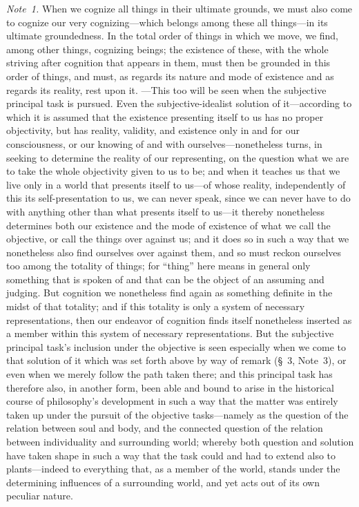 \documentclass[12pt,a4paper]{book}
\begin{document}
{\small\emph{Note~1.} When we cognize all things in their ultimate grounds, we must
also come to cognize our very cognizing---which belongs among these all things---in
its ultimate groundedness. In the total order of things in which we move, we find,
among other things, cognizing beings; the existence of these, with the whole
striving after cognition that appears in them, must then be grounded in this order
of things, and must, as regards its nature and mode of existence and as regards its
reality, rest upon it. ---This too will be seen when the subjective principal task
is pursued. Even the subjective-idealist solution of it---according to which it is
assumed that the existence presenting itself to us has no proper objectivity, but
has reality, validity, and existence only in and for our consciousness, or our
knowing of and with ourselves---nonetheless turns, in seeking to determine the
reality of our representing, on the question what we are to take the whole
objectivity given to us to be; and when it teaches us that we live only in a world
that presents itself to us---of whose reality, independently of this its
self-presentation to us, we can never speak, since we can never have to do with
anything other than what presents itself to us---it thereby nonetheless determines
both our existence and the mode of existence of what we call the objective, or call
the things over against us; and it does so in such a way that we nonetheless also
find ourselves over against them, and so must reckon ourselves too among the
totality of things; for ``thing'' here means in general only something that is
spoken of and that can be the object of an assuming and judging. But cognition we
nonetheless find again as something definite in the midst of that totality; and if
this totality is only a system of necessary representations, then our endeavor of
cognition finds itself nonetheless inserted as a member within this system of
necessary representations. But the subjective principal task's inclusion under the
objective is seen especially when we come to that solution of it which was set
forth above by way of remark (\S~3, Note~3), or even when we merely follow the path
taken there; and this principal task has therefore also, in another form, been able
and bound to arise in the historical course of philosophy's development in such a
way that the matter was entirely taken up under the pursuit of the objective
tasks---namely as the question of the relation between soul and body, and the
connected question of the relation between individuality and surrounding world;
whereby both question and solution have taken shape in such a way that the task
could and had to extend also to plants---indeed to everything that, as a member of
the world, stands under the determining influences of a surrounding world, and yet
acts out of its own peculiar nature.\par}
\end{document}
